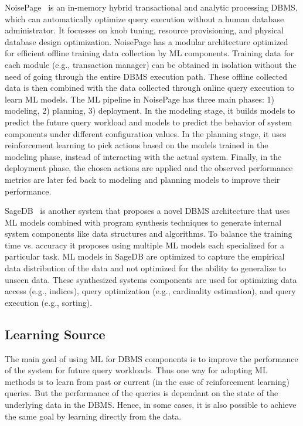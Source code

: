 NoisePage~\cite{noisepage} is an in-memory hybrid transactional and analytic processing DBMS, which can automatically optimize query execution without a human database administrator.
It focusses on knob tuning, resource provisioning, and physical database design optimization.
NoisePage has a modular architecture optimized for efficient offline training data collection by ML components.
Training data for each module (e.g., transaction manager) can be obtained in isolation without the need of going through the entire DBMS execution path.
These offline collected data is then combined with the data collected through online query execution to learn ML models.
The ML pipeline in NoisePage has three main phases: 1) modeling, 2) planning, 3) deployment.
In the modeling stage, it builds models to predict the future query workload and models to predict the behavior of system components under different configuration values.
In the planning stage, it uses reinforcement learning to pick actions based on the models trained in the modeling phase, instead of interacting with the actual system.
Finally, in the deployment phase, the chosen actions are applied and the observed performance metrics are later fed back to modeling and planning models to improve their performance.

SageDB~\cite{sagedb} is another system that proposes a novel DBMS architecture that uses ML models combined with program synthesis techniques to generate internal system components like data structures and algorithms.
To balance the training time vs. accuracy it proposes using multiple ML models each specialized for a particular task.
ML models in SageDB are optimized to capture the empirical data distribution of the data and not optimized for the ability to generalize to unseen data.
These synthesized systems components are used for optimizing data access (e.g., indices), query optimization (e.g., cardinality estimation), and query execution (e.g., sorting).


\subsection{Learning Source} 
The main goal of using ML for DBMS components is to improve the performance of the system for future query workloads.
Thus one way for adopting ML methods is to learn from past or current (in the case of reinforcement learning) queries.
But the performance of the queries is dependant on the state of the underlying data in the DBMS.
Hence, in some cases, it is also possible to achieve the same goal by learning directly from the data.

